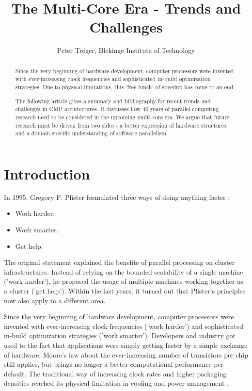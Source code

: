 \documentclass[a4paper]{article}
\title{The Multi-Core Era - Trends and Challenges}
\author{Peter Tr\"oger, Blekinge Institute of Technology}
\begin{document}
\maketitle
\begin{abstract}
Since the very beginning of hardware development, computer processors were invented with ever-increasing clock frequencies and sophisticated in-build
optimization strategies. Due to physical limitations, this 'free lunch' of
speedup has come to an end.

The following article gives a summary and bibliography for recent trends and challenges in CMP architectures. It discusses how 40 years of parallel computing research need to be considered in the upcoming multi-core era. We argue that future research must be driven from two sides - a better expression of hardware structures, and a domain-specific understanding of software parallelism.
\end{abstract}
\section{Introduction}
In 1995, Gregory F. Pfister formulated three ways of doing anything faster \cite{pfister}:

\begin{itemize}
	\item Work harder.
	\item Work smarter.
	\item Get help.
\end{itemize}

The original statement explained the benefits of parallel processing on cluster infrastructures. Instead of relying on the bounded scalability of a single machine ('work harder'), he proposed the usage of multiple machines working together as a cluster ('get help'). Within the last years, it turned out that Pfister's principles now also apply to a different area. 

Since the very beginning of hardware development, computer processors were invented with ever-increasing clock frequencies ('work harder') and sophisticated in-build optimization strategies ('work smarter'). Developers and industry got used to the fact that applications were simply getting faster by a simple exchange of hardware. Moore's law about the ever-increasing number of transistors per chip still applies, but brings no longer a better computational performance per default. The traditional way of increasing clock rates and higher packaging densities reached its physical limitation in cooling and power management \cite{olukotun:future:acmqueue:2005}.
\end{document}
